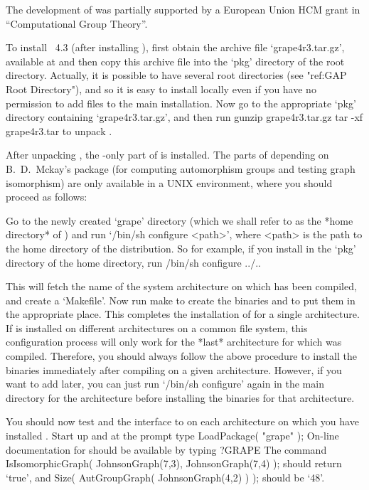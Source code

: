 The development of {\GRAPE} was partially supported by a European Union
HCM grant in ``Computational Group Theory''.


To install {\GRAPE}~4.3 (after installing {\GAP}), first
obtain the {\GRAPE} archive file `grape4r3.tar.gz', available at
 and
then copy this archive file into the `pkg' directory of the {\GAP}
root directory. Actually, it is possible to have several {\GAP} root
directories (see "ref:GAP Root Directory"), and so it is easy to install
{\GRAPE} locally even if you have no permission to add files to the main
{\GAP} installation.  Now go to the appropriate `pkg' directory containing
`grape4r3.tar.gz', and then run
\begintt
gunzip grape4r3.tar.gz
tar -xf grape4r3.tar
\endtt
to unpack {\GRAPE}.

After unpacking {\GRAPE}, the {\GAP}-only part of {\GRAPE} is installed.
The parts of {\GRAPE} depending on B.~D.~Mckay's {\nauty} package (for
computing automorphism groups and testing graph isomorphism) are only
available in a UNIX environment, where you should proceed as follows:

Go to the newly created `grape' directory (which we shall refer to as
the *home directory* of {\GRAPE}) and run `/bin/sh configure <path>',
where <path> is the path to the home directory of the {\GAP} distribution.
So for example, if you install {\GRAPE} in the `pkg' directory of the
{\GAP} home directory, run
\begintt
/bin/sh configure ../..
\endtt

This will fetch the name of the system architecture on which {\GAP}
has been compiled, and create a `Makefile'. Now run
\begintt
make
\endtt
to create the binaries and to put them in the appropriate place.
This completes the installation of {\GRAPE} for a single architecture.
If {\GAP} is installed on different architectures on a common file system,
this configuration process will only work for the *last* architecture
for which {\GAP} was compiled. Therefore, you should always follow
the above procedure to install the {\GRAPE} binaries immediately after
compiling {\GAP} on a given architecture. However, if you want to add
{\GRAPE} later, you can just run `/bin/sh configure' again in the main
{\GAP} directory for the architecture before installing the {\GRAPE}
binaries for that architecture.

You should now test {\GRAPE} and the interface to {\nauty} on each
architecture on which you have installed {\GRAPE}. Start up {\GAP}
and at the prompt type
\begintt
LoadPackage( "grape" );
\endtt
On-line documentation for {\GRAPE} should be available by typing 
\begintt
?GRAPE
\endtt
The command
\begintt
IsIsomorphicGraph( JohnsonGraph(7,3), JohnsonGraph(7,4) );
\endtt
should return `true', and 
\begintt
Size( AutGroupGraph( JohnsonGraph(4,2) ) );
\endtt
should be `48'.

